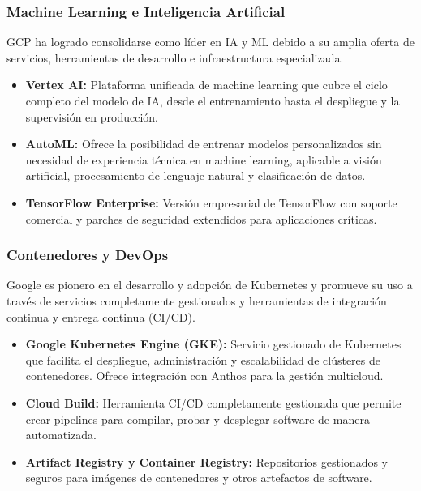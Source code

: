 {            \subsubsection{Machine Learning e Inteligencia Artificial}
                GCP ha logrado consolidarse como líder en IA y ML debido a su amplia oferta de servicios, herramientas de desarrollo e infraestructura especializada.
                
                \begin{itemize}
                    \item \textbf{Vertex AI:} Plataforma unificada de machine learning que cubre el ciclo completo del modelo de IA, desde el entrenamiento hasta el despliegue y la supervisión en producción.
                    \item \textbf{AutoML:} Ofrece la posibilidad de entrenar modelos personalizados sin necesidad de experiencia técnica en machine learning, aplicable a visión artificial, procesamiento de lenguaje natural y clasificación de datos.
                    \item \textbf{TensorFlow Enterprise:} Versión empresarial de TensorFlow con soporte comercial y parches de seguridad extendidos para aplicaciones críticas.
                \end{itemize}
            
            \subsubsection{Contenedores y DevOps}
                Google es pionero en el desarrollo y adopción de Kubernetes y promueve su uso a través de servicios completamente gestionados y herramientas de integración continua y entrega continua (CI/CD).
                
                \begin{itemize}
                    \item \textbf{Google Kubernetes Engine (GKE):} Servicio gestionado de Kubernetes que facilita el despliegue, administración y escalabilidad de clústeres de contenedores. Ofrece integración con Anthos para la gestión multicloud.
                    \item \textbf{Cloud Build:} Herramienta CI/CD completamente gestionada que permite crear pipelines para compilar, probar y desplegar software de manera automatizada.
                    \item \textbf{Artifact Registry y Container Registry:} Repositorios gestionados y seguros para imágenes de contenedores y otros artefactos de software.
                \end{itemize}
                
}
